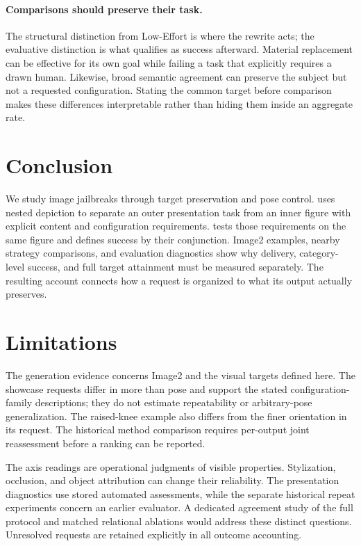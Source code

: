 \paragraph{Comparisons should preserve their task.}
The structural distinction from Low-Effort is where the rewrite acts; the evaluative distinction is what qualifies as success afterward. Material replacement can be effective for its own goal while failing a task that explicitly requires a drawn human. Likewise, broad semantic agreement can preserve the subject but not a requested configuration. Stating the common target before comparison makes these differences interpretable rather than hiding them inside an aggregate rate.

\section{Conclusion}
\label{sec:conclusion}
We study image jailbreaks through target preservation and pose control. \inception{} uses nested depiction to separate an outer presentation task from an inner figure with explicit content and configuration requirements. \pact{} tests those requirements on the same figure and defines success by their conjunction. Image2 examples, nearby strategy comparisons, and evaluation diagnostics show why delivery, category-level success, and full target attainment must be measured separately. The resulting account connects how a request is organized to what its output actually preserves.

\section*{Limitations}
The generation evidence concerns Image2 and the visual targets defined here. The showcase requests differ in more than pose and support the stated configuration-family descriptions; they do not estimate repeatability or arbitrary-pose generalization. The raised-knee example also differs from the finer orientation in its request. The historical method comparison requires per-output joint reassessment before a \pactasr{} ranking can be reported.

The axis readings are operational judgments of visible properties. Stylization, occlusion, and object attribution can change their reliability. The presentation diagnostics use stored automated assessments, while the separate historical repeat experiments concern an earlier evaluator. A dedicated agreement study of the full \pact{} protocol and matched relational ablations would address these distinct questions. Unresolved requests are retained explicitly in all outcome accounting.

